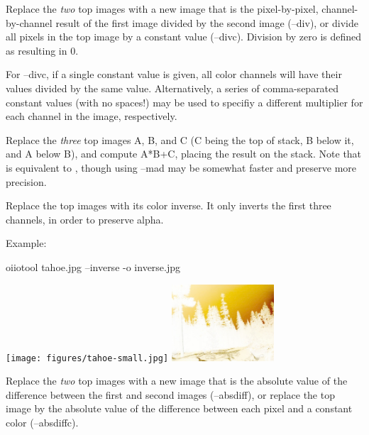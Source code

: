 Replace the \emph{two} top images with a new image that is the
pixel-by-pixel, channel-by-channel result of the first image divided by
the second image ({\cf --div}), or divide all
pixels in the top image by a constant value ({\cf --divc}).
Division by zero is defined as resulting in 0.

For {\cf --divc}, if a single constant value is given, all color channels
will have their values divided by the same value.  Alternatively, a series
of comma-separated constant values (with no spaces!) may be used to specifiy
a different multiplier for each channel in the image, respectively.
\apiend

Replace the \emph{three} top images A, B, and C (C being the top of stack, B
below it, and A below B), and compute A*B+C, placing the result on the
stack. Note that  is equivalent to ,
though using {\cf --mad} may be somewhat faster and preserve more precision.

\apiend


Replace the top images with its color inverse. It only inverts the first
three channels, in order to preserve alpha.

\noindent Example:
\begin{code}
   oiiotool tahoe.jpg --inverse -o inverse.jpg
\end{code}
\spc \texttt{[image: figures/tahoe-small.jpg]}
\raisebox{40pt}{\large $\rightarrow$}
\includegraphics[width=1.5in]{figures/invert.jpg} \\
\apiend


Replace the \emph{two} top images with a new image that is the absolute
value of the difference between the first and second images ({\cf --absdiff}),
or replace the top image by the absolute value of the difference between each
pixel and a constant color ({\cf --absdiffc}).
\apiend

